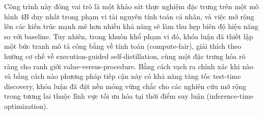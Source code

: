 Công trình này đóng vai trò là một khảo sát thực nghiệm đặc trưng trên một mô hình 4B duy nhất trong phạm vi tài nguyên tính toán cá nhân, và việc mở rộng lên các kiến trúc mạnh mẽ hơn nhiều khả năng sẽ làm thu hẹp biên độ hiệu năng so với baseline. Tuy nhiên, trong khuôn khổ phạm vi đó, khóa luận đã thiết lập một bức tranh mô tả công bằng về tính toán (compute-fair), giải thích theo hướng cơ chế về execution-guided self-distillation, cùng một đặc trưng hóa rõ ràng cho ranh giới value-versus-procedure. Bằng cách vạch ra chính xác khi nào và bằng cách nào phương pháp tiếp cận này có khả năng tăng tốc test-time discovery, khóa luận đã đặt nền móng vững chắc cho các nghiên cứu mở rộng trong tương lai thuộc lĩnh vực tối ưu hóa tại thời điểm suy luận (inference-time optimization).

